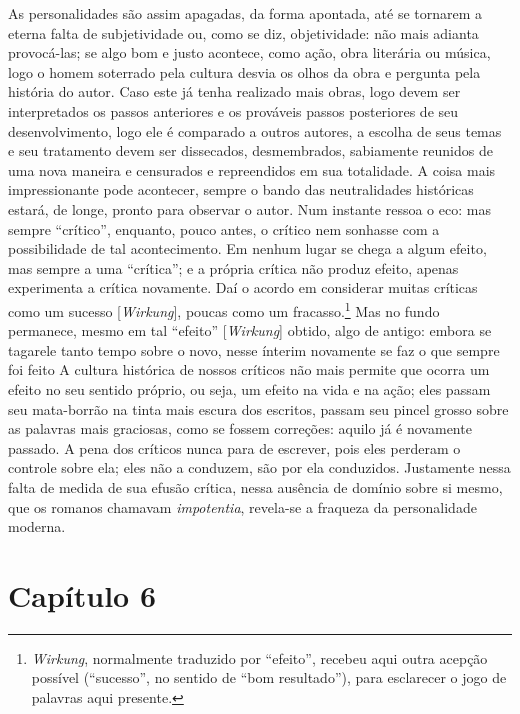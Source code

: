 As personalidades são assim apagadas, da forma apontada, até se tornarem
a eterna falta de subjetividade ou, como se diz, objetividade: não mais
adianta provocá-las; se algo bom e justo acontece, como ação, obra
literária ou música, logo o homem soterrado pela cultura desvia os olhos
da obra e pergunta pela história do autor. Caso este já tenha realizado
mais obras, logo devem ser interpretados os passos anteriores e os
prováveis passos posteriores de seu desenvolvimento, logo ele é
comparado a outros autores, a escolha de seus temas e seu tratamento
devem ser dissecados, desmembrados, sabiamente reunidos de uma nova
maneira e censurados e repreendidos em sua totalidade. A coisa mais
impressionante pode acontecer, sempre o bando das neutralidades
históricas estará, de longe, pronto para observar o autor. Num instante
ressoa o eco: mas sempre ``crítico'', enquanto, pouco antes, o crítico
nem sonhasse com a possibilidade de tal acontecimento. Em nenhum lugar
se chega a algum efeito, mas sempre a uma ``crítica''; e a própria
crítica não produz efeito, apenas experimenta a crítica novamente. Daí o
acordo em considerar muitas críticas como um sucesso
{[}\emph{Wirkung}{]}, poucas como um fracasso.\footnote{\emph{Wirkung},
  normalmente traduzido por ``efeito'', recebeu aqui outra acepção
  possível (``sucesso'', no sentido de ``bom resultado''), para
  esclarecer o jogo de palavras aqui presente.} Mas no fundo permanece,
mesmo em tal ``efeito'' {[}\emph{Wirkung}{]} obtido, algo de antigo:
embora se tagarele tanto tempo sobre o novo, nesse ínterim novamente se
faz o que sempre foi feito A cultura histórica de nossos críticos não
mais permite que ocorra um efeito no seu sentido próprio, ou seja, um
efeito na vida e na ação; eles passam seu mata-borrão na tinta mais
escura dos escritos, passam seu pincel grosso sobre as palavras mais
graciosas, como se fossem correções: aquilo já é novamente passado. A
pena dos críticos nunca para de escrever, pois eles perderam o controle
sobre ela; eles não a conduzem, são por ela conduzidos. Justamente nessa
falta de medida de sua efusão crítica, nessa ausência de domínio sobre
si mesmo, que os romanos chamavam \emph{impotentia}, revela-se a
fraqueza da personalidade moderna.

\chapter{Capítulo 6}\label{capuxedtulo-6}

